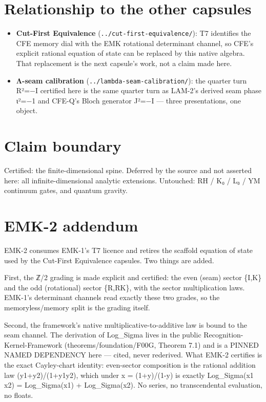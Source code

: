\hypertarget{relationship-to-the-other-capsules}{%
\section{Relationship to the other capsules}\label{relationship-to-the-other-capsules}}

\begin{itemize}
\tightlist
\item
  \textbf{Cut-First Equivalence} (\texttt{../cut-first-equivalence/}): T7 identifies
  the CFE memory dial with the EMK rotational determinant channel, so
  CFE's explicit rational equation of state can be replaced by this
  native algebra. That replacement is the next capsule's work, not a
  claim made here.
\item
  \textbf{Λ-seam calibration} (\texttt{../lambda-seam-calibration/}): the quarter turn
  R²=−I certified here is the same quarter turn as LAM-2's derived seam
  phase ι²=−1 and CFE-Q's Bloch generator J²=−I --- three presentations,
  one object.
\end{itemize}

\hypertarget{claim-boundary}{%
\section{Claim boundary}\label{claim-boundary}}

Certified: the finite-dimensional spine. Deferred by the source and not
asserted here: all infinite-dimensional analytic extensions. Untouched:
RH / K₀ / L₀ / YM continuum gates, and quantum gravity.

\hypertarget{emk-2-addendum}{%
\section{EMK-2 addendum}\label{emk-2-addendum}}

EMK-2 consumes EMK-1's T7 licence and retires the scaffold equation of
state used by the Cut-First Equivalence capsules. Two things are added.

First, the ℤ/2 grading is made explicit and certified: the even (seam)
sector \{I,K\} and the odd (rotational) sector \{R,RK\}, with the sector
multiplication laws. EMK-1's determinant channels read exactly these two
grades, so the memoryless/memory split is the grading itself.

Second, the framework's native multiplicative-to-additive law is bound to
the seam channel. The derivation of Log\_Sigma lives in the public
Recognition-Kernel-Framework (theorems/foundation/F00G, Theorem 7.1) and
is a PINNED NAMED DEPENDENCY here --- cited, never rederived. What EMK-2
certifies is the exact Cayley-chart identity: even-sector composition is
the rational addition law (y1+y2)/(1+y1y2), which under
x = (1+y)/(1-y) is exactly Log\_Sigma(x1 x2) = Log\_Sigma(x1) +
Log\_Sigma(x2). No series, no transcendental evaluation, no floats.

